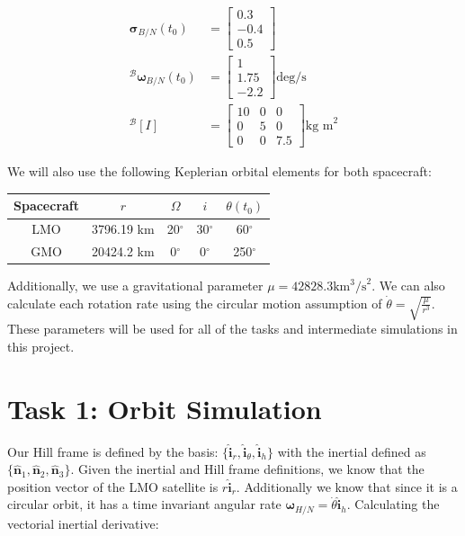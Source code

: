 \documentclass[paper]{aiaaNew}
\begin{document}
\begin{align}
  \bm{\sigma}_{B/N}(t_0) &= \begin{bmatrix} 0.3 \\ -0.4 \\ 0.5 \end{bmatrix} \\
  ^\mathcal{B}\bm{\omega}_{B/N}(t_0) &= \begin{bmatrix} 1 \\ 1.75 \\ -2.2 \end{bmatrix} \text{deg/s} \\
  ^\mathcal{B}[I] &= 
  \begin{bmatrix}
  10 & 0 & 0 \\
  0 & 5 & 0 \\
  0 & 0 & 7.5
  \end{bmatrix} \text{kg m}^2
\end{align}

We will also use the following Keplerian orbital elements for both spacecraft:

\begin{center}
 \begin{tabular}{||c c c c c||} 
 \hline
 Spacecraft & $r$ & $\Omega$ & $i$ & $\theta(t_0)$\\ [0.5ex] 
 \hline\hline
 LMO & 3796.19 km & 20$^\circ$ & 30$^\circ$ & 60$^\circ$ \\ 
 \hline
 GMO & 20424.2 km & 0$^\circ$ & 0$^\circ$ & 250$^\circ$ \\
 \hline
\end{tabular}
\end{center}

Additionally, we use a gravitational parameter $\mu = 42828.3 \text{km}^3 \text{/s}^2$. We can also calculate each rotation rate using the circular motion assumption of $\dot{\theta} = \sqrt { \frac{\mu}{r^3}}$. These parameters will be used for all of the tasks and intermediate simulations in this project.



\section*{Task 1: Orbit Simulation}
Our Hill frame is defined by the basis: $\{\bm{\hat{i}}_r, \bm{\hat{i}}_\theta, \bm{\hat{i}}_h \}$ with the inertial defined as $\{\bm{\hat{n}}_1, \bm{\hat{n}}_2, \bm{\hat{n}}_3 \}$. Given the inertial and Hill frame definitions, we know that the position vector of the LMO satellite is $r\bm{\hat{i}}_r$. Additionally we know that since it is a circular orbit, it has a time invariant angular rate ${\bm{\omega}}_{H/N} = \dot{\theta}\mathbf{\hat{i}}_h$. Calculating the vectorial inertial derivative:
\end{document}
